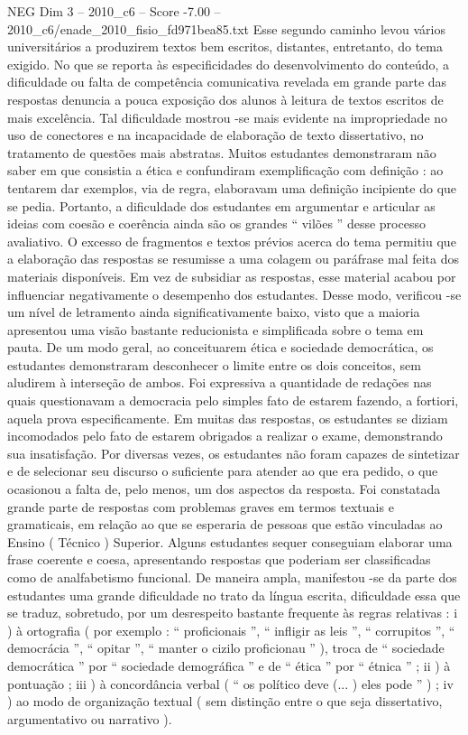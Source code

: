 \begin{textsample}{NEG Dim 3 – 2010\_c6 – Score -7.00 – 2010\_c6/enade\_2010\_fisio\_fd971bea85.txt}
Esse segundo caminho levou vários universitários a produzirem textos bem escritos, distantes, entretanto, do tema exigido.
No que se reporta às especificidades do desenvolvimento do conteúdo, a dificuldade ou falta de competência comunicativa revelada em grande parte das respostas denuncia a pouca exposição dos alunos à leitura de textos escritos de mais excelência.
Tal dificuldade mostrou -se mais evidente na impropriedade no uso de conectores e na incapacidade de elaboração de texto dissertativo, no tratamento de questões mais abstratas.
Muitos estudantes demonstraram não saber em que consistia a ética e confundiram exemplificação com definição : ao tentarem dar exemplos, via de regra, elaboravam uma definição incipiente do que se pedia.
Portanto, a dificuldade dos estudantes em argumentar e articular as ideias com coesão e coerência ainda são os grandes “ vilões ” desse processo avaliativo.
O excesso de fragmentos e textos prévios acerca do tema permitiu que a elaboração das respostas se resumisse a uma colagem ou paráfrase mal feita dos materiais disponíveis.
Em vez de subsidiar as respostas, esse material acabou por influenciar negativamente o desempenho dos estudantes.
Desse modo, verificou -se um nível de letramento ainda significativamente baixo, visto que a maioria apresentou uma visão bastante reducionista e simplificada sobre o tema em pauta.
De um modo geral, ao conceituarem ética e sociedade democrática, os estudantes demonstraram desconhecer o limite entre os dois conceitos, sem aludirem à interseção de ambos.
Foi expressiva a quantidade de redações nas quais questionavam a democracia pelo simples fato de estarem fazendo, a fortiori, aquela prova especificamente.
Em muitas das respostas, os estudantes se diziam incomodados pelo fato de estarem obrigados a realizar o exame, demonstrando sua insatisfação.
Por diversas vezes, os estudantes não foram capazes de sintetizar e de selecionar seu discurso o suficiente para atender ao que era pedido, o que ocasionou a falta de, pelo menos, um dos aspectos da resposta.
Foi constatada grande parte de respostas com problemas graves em termos textuais e gramaticais, em relação ao que se esperaria de pessoas que estão vinculadas ao Ensino ( Técnico ) Superior.
Alguns estudantes sequer conseguiam elaborar uma frase coerente e coesa, apresentando respostas que poderiam ser classificadas como de analfabetismo funcional.
De maneira ampla, manifestou -se da parte dos estudantes uma grande dificuldade no trato da língua escrita, dificuldade essa que se traduz, sobretudo, por um desrespeito bastante frequente às regras relativas : i ) à ortografia ( por exemplo : “ proficionais ”, “ infligir as leis ”, “ corrupitos ”, “ democrácia ”, “ opitar ”, “ manter o cizilo proficionau ” ), troca de “ sociedade democrática ” por “ sociedade demográfica ” e de “ ética ” por “ étnica ” ; ii ) à pontuação ; iii ) à concordância verbal ( “ os político deve (... ) eles pode ” ) ; iv ) ao modo de organização textual ( sem distinção entre o que seja dissertativo, argumentativo ou narrativo ).

\end{textsample}
